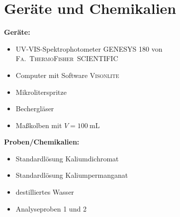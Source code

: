 \newpage
\section{Geräte und Chemikalien}
\label{sec:geraete}

\textbf{Geräte:}
\begin{itemize}
\item UV-VIS-Spektrophotometer \textsc{GENESYS 180\texttrademark} von \mbox{\textsc{Fa. ThermoFisher SCIENTIFIC}}
\item Computer mit Software \textsc{Visonlite}
\item Mikroliterspritze
\item Bechergläser
\item Maßkolben mit $V=\SI{100}{\milli \liter}$
\end{itemize}

\vspace*{5mm}

\textbf{Proben/Chemikalien:}
\begin{itemize}
\item Standardlösung Kaliumdichromat
\item Standardlösung Kaliumpermanganat
\item destilliertes Wasser
\item Analyseproben 1 und 2
\end{itemize}





